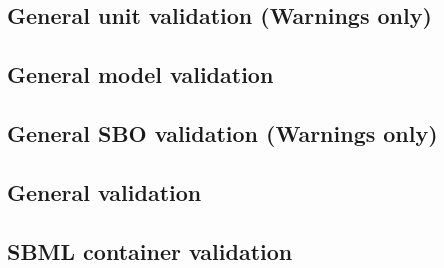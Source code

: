 \begin{sbmlenum}
\end{sbmlenum} \subsection*{General unit validation (Warnings only)} \begin{sbmlenum}


\end{sbmlenum} \subsection*{General model validation} \begin{sbmlenum}


\end{sbmlenum} \subsection*{General SBO validation (Warnings only)} \begin{sbmlenum}


\end{sbmlenum} \subsection*{General  validation} \begin{sbmlenum}


\end{sbmlenum} \subsection*{SBML container validation} \begin{sbmlenum}



\end{sbmlenum}
